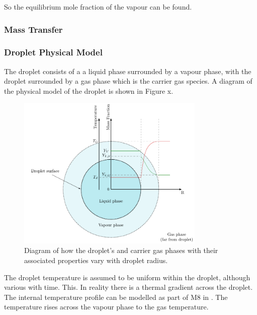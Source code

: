 \documentclass[../Interim_Report_Master]{subfiles}
\begin{document}
So the equilibrium mole fraction of the vapour can be found.

\subsubsection{Mass Transfer}

%
%
%
%
%
%


\subsubsection{Droplet Physical Model}
The droplet consists of a a liquid phase surrounded by a vapour phase, with the droplet surrounded by a gas phase which is the carrier gas species. A diagram of the physical model of the droplet is shown in Figure x.
\begin{figure}[h]
	\centering
	\includegraphics[width=0.8\textwidth]{./Diagrams/Droplet_Diagram/Droplet_Diagram.pdf}
	\caption{Diagram of how the droplet's and carrier gas phases with their associated properties vary with droplet radius.}
	\label{drop_diag}
\end{figure}

The droplet temperature is assumed to be uniform within the droplet, although various with time. This. In reality there is a thermal gradient across the droplet. The internal temperature profile can be modelled as part of M8 in \cite{Miller1998}. The temperature rises across the vapour phase to the gas temperature. 
\end{document}
